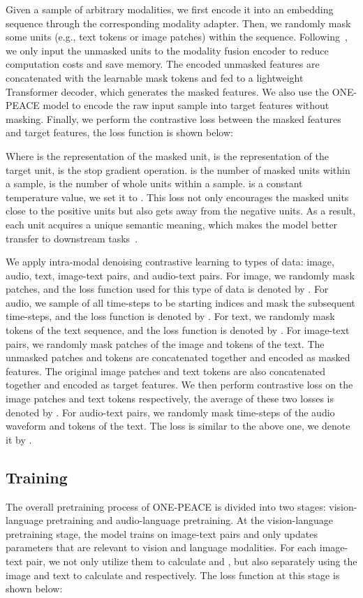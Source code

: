 \documentclass{article}
\newcommand{\onepeace}{ONE-PEACE\xspace}
\begin{document}
Given a sample of arbitrary modalities, we first encode it into an embedding sequence through the corresponding modality adapter.
Then, we randomly mask some units (e.g., text tokens or image patches) within the sequence.
Following~\cite{mae}, we only input the unmasked units to the modality fusion encoder to reduce computation costs and save memory.
The encoded unmasked features are concatenated with the learnable mask tokens and fed to a lightweight Transformer decoder, which generates the masked features.
We also use the \onepeace model to encode the raw input sample into target features without masking.
Finally, we perform the contrastive loss between the masked features and target features, the loss function is shown below:



Where  is the representation of the masked unit,  is the representation of the target unit,  is the stop gradient operation.  is the number of masked units within a sample,  is the number of whole units within a sample.  is a constant temperature value, we set it to . 
This loss not only encourages the masked units close to the positive units but also gets away from the negative units.
As a result, each unit acquires a unique semantic meaning, which makes the model better transfer to downstream tasks~\cite{fd-clip}.

We apply intra-modal denoising contrastive learning to  types of data: image, audio, text, image-text pairs, and audio-text pairs.
For image, we randomly mask  patches, and the loss function used for this type of data is denoted by .
For audio, we sample  of all time-steps to be starting indices and mask the subsequent  time-steps, and the loss function is denoted by .
For text, we randomly mask  tokens of the text sequence, and the loss function is denoted by .
For image-text pairs, we randomly mask  patches of the image and  tokens of the text. The unmasked patches and tokens are concatenated together and encoded as masked features.
The original image patches and text tokens are also concatenated together and encoded as target features.
We then perform contrastive loss on the image patches and text tokens respectively, the average of these two
losses is denoted by .
For audio-text pairs, we randomly mask  time-steps of the audio waveform and  tokens of the text. 
The loss is similar to the above one, we denote it by .

\subsection{Training}
\label{sec:two_stage_pretraining}
The overall pretraining process of \onepeace is divided into two stages: vision-language pretraining and audio-language pretraining.
At the vision-language pretraining stage, the model trains on image-text pairs and only updates parameters that are relevant to vision and language modalities.
For each image-text pair, we not only utilize them to calculate  and , but also separately using the image and text to calculate  and  respectively.
The loss function at this stage is shown below:
\end{document}
